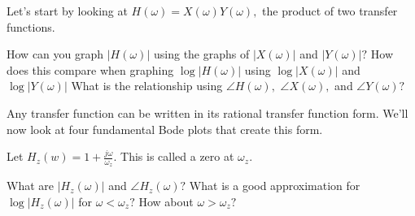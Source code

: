 


\begin{enumerate}
\qitem Let's start by looking at $H(\omega) = X(\omega) Y(\omega),$ the product of two transfer functions.

  \begin{enumerate}[(i)]
    \qitem How can you graph $|H(\omega)|$ using the graphs of $|X(\omega)|$ and $|Y(\omega)|?$
    \qitem How does this compare when graphing $\log |H(\omega)|$ using $\log |X(\omega)|$ and $\log |Y(\omega)|$
    \qitem What is the relationship using $\angle H(\omega),$ $\angle X(\omega),$ and $\angle Y(\omega)?$
  \end{enumerate}



Any transfer function can be written in its rational transfer function form. We'll now look at four fundamental Bode plots that create this form.

\qitem Let $H_z(w) = 1 + \frac{j \omega}{\omega_{z}}.$ This is called a zero at $\omega_{z}.$
  \begin{enumerate}[(i)] 
    \qitem What are $|H_z(\omega)|$ and $\angle H_z(\omega)?$
    \qitem What is a good approximation for $\log |H_z(\omega)|$ for $\omega < \omega_{z}?$ How about $\omega > \omega_{z}?$
    \qitem 

  \end{enumerate}


\end{enumerate}
